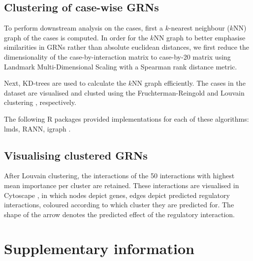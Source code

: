 \subsection{Clustering of case-wise GRNs}
To perform downstream analysis on the cases, first a $k$-nearest neighbour ($k$NN) graph of the cases is computed.
In order for the $k$NN graph to better emphasise similarities in GRNs rather than absolute euclidean distances, we first reduce the dimensionality of the case-by-interaction matrix to case-by-20 matrix using Landmark Multi-Dimensional Scaling \cite{lee_landmarkmdsensemble_2009} with a Spearman rank distance metric.  

Next, KD-trees are used to calculate the $k$NN graph efficiently. The cases in the dataset are visualised and clusted using the Fruchterman-Reingold \cite{fruchterman_graphdrawingforcedirected_1991} and Louvain clustering \cite{blondel_fastunfoldingcommunities_2008}, respectively.

The following R packages provided implementations for each of these algorithms: lmds, RANN, igraph \cite{csardi_igraphsoftwarepackage_2006}.


\subsection{Visualising clustered GRNs}
After Louvain clustering, the interactions of the 50 interactions with highest mean importance per cluster are retained. These interactions are visualised in Cytoscape \cite{shannon_cytoscapesoftwareenvironment_2003}, in which nodes depict genes, edges depict predicted regulatory interactions, coloured according to which cluster they are predicted for. The shape of the arrow denotes the predicted effect of the regulatory interaction.

%

\section{Supplementary information}


